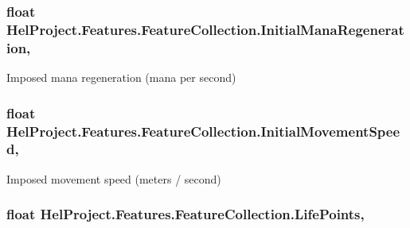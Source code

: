 \subsubsection[{Initial\+Mana\+Regeneration}]{\setlength{\rightskip}{0pt plus 5cm}float Hel\+Project.\+Features.\+Feature\+Collection.\+Initial\+Mana\+Regeneration\hspace{0.3cm}{\ttfamily [get]}, {\ttfamily [set]}}\label{class_hel_project_1_1_features_1_1_feature_collection_a83624876566cbf6cf24e9f566bbd701e}


Imposed mana regeneration (mana per second) 

\hypertarget{class_hel_project_1_1_features_1_1_feature_collection_a9895c940500d9d028278ea3c175fd916}{}
\subsubsection[{Initial\+Movement\+Speed}]{\setlength{\rightskip}{0pt plus 5cm}float Hel\+Project.\+Features.\+Feature\+Collection.\+Initial\+Movement\+Speed\hspace{0.3cm}{\ttfamily [get]}, {\ttfamily [set]}}\label{class_hel_project_1_1_features_1_1_feature_collection_a9895c940500d9d028278ea3c175fd916}


Imposed movement speed (meters / second) 

\hypertarget{class_hel_project_1_1_features_1_1_feature_collection_aa5b4b80b733386bb7bfb742b8481f4e8}{}
\subsubsection[{Life\+Points}]{\setlength{\rightskip}{0pt plus 5cm}float Hel\+Project.\+Features.\+Feature\+Collection.\+Life\+Points\hspace{0.3cm}{\ttfamily [get]}, {\ttfamily [set]}}\label{class_hel_project_1_1_features_1_1_feature_collection_aa5b4b80b733386bb7bfb742b8481f4e8}


